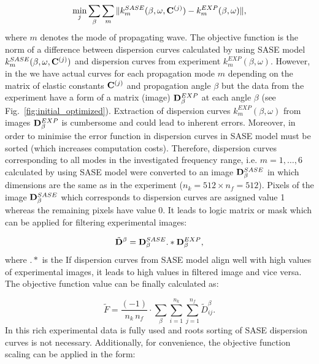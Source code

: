 \begin{equation}
	\min_j \sum_{\beta}\sum_{m} \| k^{SASE}_{m}(\beta, \omega,\mathbf{C}^{(j)}) -k^{EXP}_{m}(\beta,\omega) \|,
\label{eq:error_fun}\end{equation}
where \(m\) denotes the mode of propagating wave.
The objective function is the norm of a difference between dispersion curves calculated by using  SASE model \(k^{SASE}_{m}(\beta, \omega,\mathbf{C}^{(j)})\) and dispersion curves from experiment \(k^{EXP}_{m}(\beta,\omega)\). 
However, in the 
	  we have actual curves for each propagation mode \(m\) depending on the matrix of elastic constants \(\mathbf{C}^{(j)}\) and propagation angle \(\beta\) but the data from the experiment have a form of a matrix (image) \(\mathbf{D}^{EXP}_{\beta}\) at each angle \(\beta\) (see Fig.~\ref{fig:initial_optimized}).
Extraction of dispersion curves \(k^{EXP}_{m}(\beta,\omega)\) from images \(\mathbf{D}^{EXP}_{\beta}\) is cumbersome and could lead to inherent errors. 
Moreover, in order to minimise the error function in   dispersion curves in  SASE model must be sorted (which increases computation costs). 
Therefore, dispersion curves corresponding to all modes in the investigated frequency range, i.e. \(m=1,\ldots, 6\) calculated by using  SASE model were converted to an image \(\mathbf{D}^{SASE}_{\beta}\) in which dimensions are the same as in the experiment (\(n_k=512 \times n_f= 512\)). 
Pixels of the image \(\mathbf{D}^{SASE}_{\beta}\) which corresponds to dispersion curves are assigned value 1 whereas the remaining pixels have value 0. 
It leads to logic matrix or mask which can be applied for filtering experimental images: 
	
\begin{equation}
		\tilde{\mathbf{D}}^{\beta} =  \mathbf{D}^{SASE}_{\beta}  .*    \mathbf{D}^{EXP}_{\beta} ,
	\label{eq:objective_fun}
\end{equation}
where \(.*\) is the   
If dispersion curves from  SASE model align well with high values of experimental images, it leads to high values in  filtered image and vice versa.
The objective function value can be finally calculated as: 
	
\begin{equation}
	\tilde{F} = \frac{(-1)}{n_k \, n_f}  \cdot \sum_{\beta}  \sum_{i=1}^{n_k} \sum_{j=1}^{n_f}	\tilde{D}_{ij}^{\beta}. 
\label{eq:objective_fun_val}\end{equation}
In this   rich experimental data is fully used and roots sorting of  SASE dispersion curves is not necessary. 
Additionally, for convenience, the objective function scaling can be applied in the form:
	
